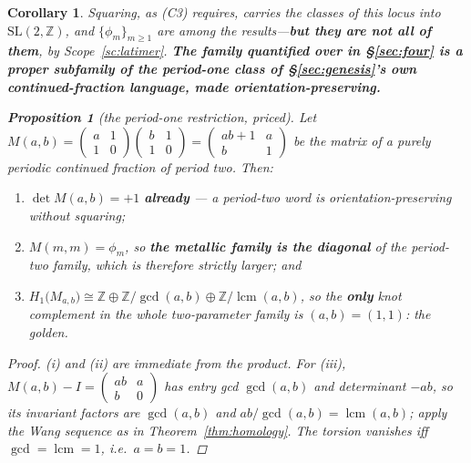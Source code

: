 \documentclass[11pt,reqno]{amsart}
\theoremstyle{plain}
\newtheorem{proposition}[theorem]{Proposition}
\newtheorem{corollary}[theorem]{Corollary}
\theoremstyle{definition}
\theoremstyle{remark}
\newcommand{\Z}{\mathbb{Z}}
\newcommand{\SL}{\mathrm{SL}}
\begin{document}
\begin{corollary}\label{cor:c3family}
Squaring, as (C3) requires, carries the classes of this locus into $\SL(2,\Z)$, and
$\{\phi_m\}_{m\ge1}$ are among the results---\textbf{but they are not all of them}, by
Scope~\ref{sc:latimer}. \textbf{The family quantified over in \S\ref{sec:four} is a proper subfamily of the period-one
class of \S\ref{sec:genesis}'s own continued-fraction language, made
orientation-preserving.}

\begin{proposition}[the period-one restriction, priced]\label{prop:periodtwo}
Let $M(a,b)=\left(\begin{smallmatrix}a&1\\1&0\end{smallmatrix}\right)
\left(\begin{smallmatrix}b&1\\1&0\end{smallmatrix}\right)
=\left(\begin{smallmatrix}ab+1&a\\b&1\end{smallmatrix}\right)$ be the matrix of a purely
periodic continued fraction of period two. Then:
\begin{enumerate}[label=\textup{(\roman*)},leftmargin=2.4em]
\item $\det M(a,b)=+1$ \textbf{already} --- a period-two word is orientation-preserving
  without squaring;
\item $M(m,m)=\phi_m$, so \textbf{the metallic family is the diagonal} of the period-two
  family, which is therefore strictly larger; and
\item $H_1\bigl(M_{a,b}\bigr)\cong\Z\oplus\Z/\gcd(a,b)\oplus\Z/\operatorname{lcm}(a,b)$,
  so the \textbf{only} knot complement in the whole two-parameter family is
  $(a,b)=(1,1)$: the golden.
\end{enumerate}
\end{proposition}

\begin{proof}
(i) and (ii) are immediate from the product. For (iii),
$M(a,b)-I=\left(\begin{smallmatrix}ab&a\\b&0\end{smallmatrix}\right)$ has entry gcd
$\gcd(a,b)$ and determinant $-ab$, so its invariant factors are $\gcd(a,b)$ and
$ab/\gcd(a,b)=\operatorname{lcm}(a,b)$; apply the Wang sequence as in
Theorem~\ref{thm:homology}. The torsion vanishes iff $\gcd=\operatorname{lcm}=1$, i.e.\
$a=b=1$.
\end{proof}


\end{corollary}
\end{document}
